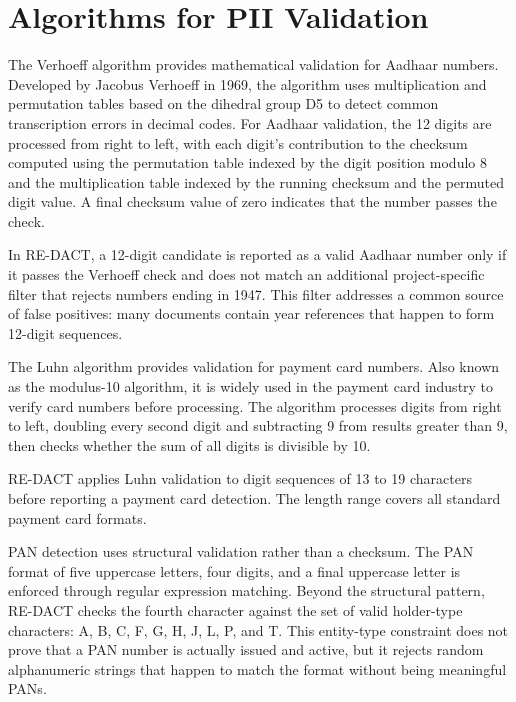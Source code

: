 \bigskip

\section{Algorithms for PII Validation}

The Verhoeff algorithm provides mathematical validation for Aadhaar numbers. Developed by Jacobus Verhoeff in 1969, the algorithm uses multiplication and permutation tables based on the dihedral group D5 to detect common transcription errors in decimal codes. For Aadhaar validation, the 12 digits are processed from right to left, with each digit's contribution to the checksum computed using the permutation table indexed by the digit position modulo 8 and the multiplication table indexed by the running checksum and the permuted digit value. A final checksum value of zero indicates that the number passes the check.

In RE-DACT, a 12-digit candidate is reported as a valid Aadhaar number only if it passes the Verhoeff check and does not match an additional project-specific filter that rejects numbers ending in 1947. This filter addresses a common source of false positives: many documents contain year references that happen to form 12-digit sequences.

The Luhn algorithm provides validation for payment card numbers. Also known as the modulus-10 algorithm, it is widely used in the payment card industry to verify card numbers before processing. The algorithm processes digits from right to left, doubling every second digit and subtracting 9 from results greater than 9, then checks whether the sum of all digits is divisible by 10.

RE-DACT applies Luhn validation to digit sequences of 13 to 19 characters before reporting a payment card detection. The length range covers all standard payment card formats.

PAN detection uses structural validation rather than a checksum. The PAN format of five uppercase letters, four digits, and a final uppercase letter is enforced through regular expression matching. Beyond the structural pattern, RE-DACT checks the fourth character against the set of valid holder-type characters: A, B, C, F, G, H, J, L, P, and T. This entity-type constraint does not prove that a PAN number is actually issued and active, but it rejects random alphanumeric strings that happen to match the format without being meaningful PANs.

\bigskip

